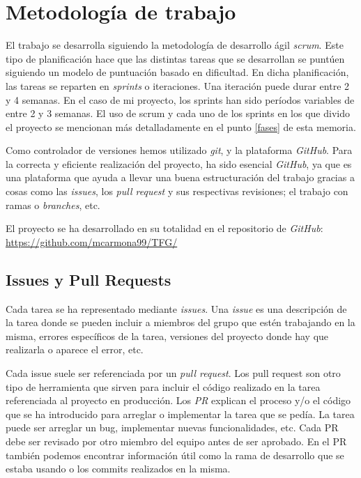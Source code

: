 \section{Metodología de trabajo}

El trabajo se desarrolla siguiendo la metodología de desarrollo ágil \textit{scrum}. Este tipo de planificación hace que las distintas tareas que se desarrollan se puntúen siguiendo un modelo de puntuación basado en dificultad. En dicha planificación, las tareas se reparten en \textit{sprints} o iteraciones. Una iteración puede durar entre 2 y 4 semanas. En el caso de mi proyecto, los sprints han sido períodos variables de entre 2 y 3 semanas. El uso de scrum y cada uno de los sprints en los que divido el proyecto se mencionan más detalladamente en el punto \ref{fases} de esta memoria.\newline

Como controlador de versiones hemos utilizado \textit{git}, y la plataforma \textit{GitHub}.
Para la correcta y eficiente realización del proyecto, ha sido esencial \textit{GitHub}, ya que es una plataforma que ayuda a llevar una buena estructuración del trabajo gracias a cosas como las \textit{issues}, los \textit{pull request} y sus respectivas revisiones; el trabajo con ramas o \textit{branches}, etc. \newline

	El proyecto se ha desarrollado en su totalidad en el repositorio de \textit{GitHub}: \color{blue} \href{https://github.com/mcarmona99/TFG/}{https://github.com/mcarmona99/TFG/} \color{black}
	
\subsection{Issues y Pull Requests}

Cada tarea se ha representado mediante \textit{issues}. Una \textit{issue} es una descripción de la tarea donde se pueden incluir a miembros del grupo que estén trabajando en la misma, errores específicos de la tarea, versiones del proyecto donde hay que realizarla o aparece el error, etc. \newline

Cada issue suele ser referenciada por un \textit{pull request}. Los pull request son otro tipo de herramienta que sirven para incluir el código realizado en la tarea referenciada al proyecto en producción. Los \textit{PR} explican el proceso y/o el código que se ha introducido para arreglar o implementar la tarea que se pedía. La tarea puede ser arreglar un bug, implementar nuevas funcionalidades, etc. Cada PR debe ser revisado por otro miembro del equipo antes de ser aprobado. En el PR también podemos encontrar información útil como la rama de desarrollo que se estaba usando o los commits realizados en la misma.
\newline

